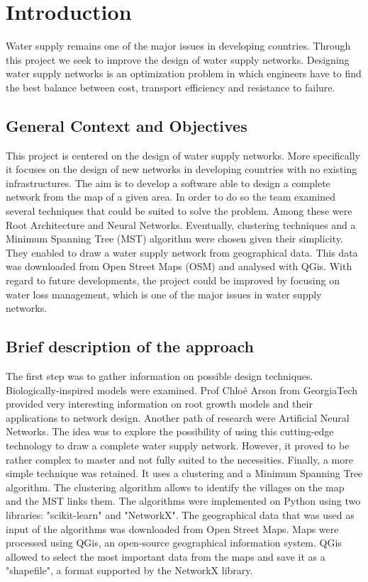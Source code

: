 \chapter{Introduction}
\label{Introduzione}
\thispagestyle{empty}






\parindent
Water supply remains one of the major issues in developing countries. Through this
project we seek to improve the design of water supply networks. Designing water supply
networks is an optimization problem in which engineers have to find the best balance
between cost, transport efficiency and resistance to failure.

\section{General Context and Objectives}
This project is centered on the design of water supply networks. More specifically it focuses on the design of new 
networks in developing countries with no existing infrastructures.
The aim is to develop a software able to design a complete network from the map of a given area.
In order to do so the team examined several techniques that could be suited to solve the problem.
Among these were Root Architecture and Neural Networks. Eventually, clustering techniques and a Minimum
Spanning Tree (MST) algorithm were chosen given their simplicity. They enabled to draw a water supply network 
from geographical data. This data was downloaded from Open Street Maps (OSM) and analysed with QGis.
With regard to future developments, the project could be improved by focusing on water loss management,
which is one of the major issues in water supply networks.

\section{Brief description of the approach}
The first step was to gather information on possible design techniques. Biologically-inspired models were
examined. Prof Chloé Arson from GeorgiaTech 
provided very interesting information on root growth models and their applications to network design.
Another path of research were Artificial Neural Networks. The idea was to explore the possibility of using
this cutting-edge technology to draw a complete water supply network. However, it proved to be rather complex
to master and not fully suited to the necessities.
Finally, a more simple technique was retained. It uses a clustering and a Minimum Spanning Tree algorithm.
The clustering algorithm allows to identify the villages on the map and the MST links them.
The algorithms were implemented on Python using two libraries: "scikit-learn" and "NetworkX".
The geographical data that was used as input of the algorithms was downloaded from Open Street Maps. 
Maps were processed using 
QGis, an open-source geographical information system. QGis allowed to select the most important 
data from the maps
and save it as a "shapefile", a format supported by the NetworkX library.

